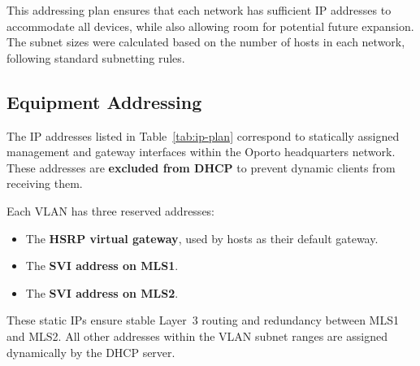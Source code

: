 This addressing plan ensures that each network has sufficient \ac{IP} addresses to accommodate all devices, while also allowing room for potential future expansion. The subnet sizes were calculated based on the number of hosts in each network, following standard subnetting rules.

\subsection{Equipment Addressing}

The \ac{IP} addresses listed in Table~\ref{tab:ip-plan} correspond to statically assigned management and gateway interfaces within the Oporto headquarters network. These addresses are \textbf{excluded from \ac{DHCP}} to prevent dynamic clients from receiving them.

\medskip

Each VLAN has three reserved addresses:
\begin{itemize}
    \item The \textbf{\ac{HSRP} virtual gateway}, used by hosts as their default gateway.
    \item The \textbf{\ac{SVI} address on MLS1}.
    \item The \textbf{\ac{SVI} address on MLS2}.
\end{itemize}

\noindent
These static \ac{IP}s ensure stable Layer~3 routing and redundancy between MLS1 and MLS2. All other addresses within the \ac{VLAN} subnet ranges are assigned dynamically by the \ac{DHCP} server.


